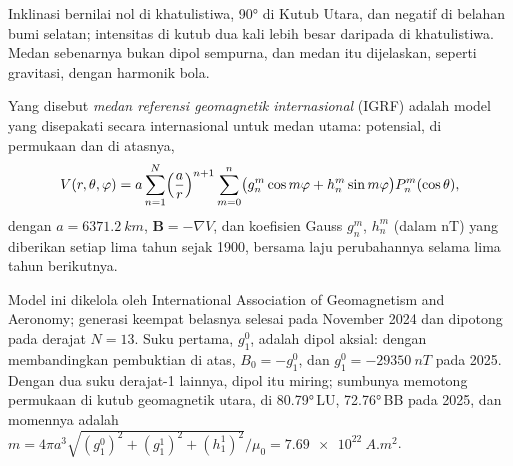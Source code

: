 Inklinasi bernilai nol di khatulistiwa, \ang{90} di Kutub Utara, dan
negatif di belahan bumi selatan; intensitas di kutub dua kali lebih besar
daripada di khatulistiwa. Medan sebenarnya bukan dipol sempurna, dan
medan itu dijelaskan, seperti gravitasi, dengan harmonik bola.

\begin{definition}\label{def:b3:palaeomagnetism:igrf}
Yang disebut \emph{medan referensi geomagnetik internasional}
(IGRF) adalah model yang disepakati secara internasional untuk
medan utama: potensial, di permukaan dan di atasnya,
\[
  V(r,\theta,\varphi) = a\sum_{n=1}^{N}\Bigl(\frac ar\Bigr)^{n+1}\sum_{m=0}^{n}
  \bigl(g_n^m\cos m\varphi + h_n^m\sin m\varphi\bigr)P_n^m(\cos\theta),
\]
dengan $a = \qty{6371.2}{km}$, $\mathbf B = -\nabla V$, dan koefisien Gauss
$g_n^m$, $h_n^m$ (dalam \unit{nT}) yang diberikan setiap lima tahun sejak 1900,
bersama laju perubahannya selama lima tahun berikutnya.
\end{definition}

Model ini dikelola oleh International Association of Geomagnetism and
Aeronomy; generasi keempat belasnya selesai pada November 2024 dan
dipotong pada derajat $N = 13$. Suku pertama, $g_1^0$, adalah dipol aksial:
dengan membandingkan pembuktian di atas, $B_0 = -g_1^0$, dan $g_1^0 = \qty{-29350}{nT}$
pada 2025. Dengan dua suku derajat-1 lainnya, dipol itu miring; sumbunya memotong
permukaan di kutub geomagnetik utara, di \ang{80.79}\,LU, \ang{72.76}\,BB pada
2025, dan momennya adalah $m = 4\pi a^3\sqrt{(g_1^0)^2 + (g_1^1)^2 +
(h_1^1)^2}/\mu_0 = \qty{7.69e22}{A.m^2}$.

